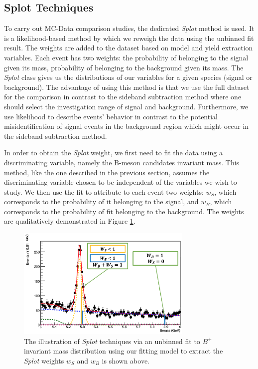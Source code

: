 \subsection{\textbf{Splot} Techniques}

To carry out MC-Data comparison studies, the dedicated \textit{Splot} method is used. It is a likelihood-based method by which we reweigh the data using the unbinned fit result. The weights are added to the dataset based on model and yield extraction variables. Each event has two weights: the probability of belonging to the signal given its mass, probability of belonging to the background given its mass. The \textit{Splot} class gives us the distributions of our variables for a given species (signal or background). The advantage of using this method is that we use the full dataset for the comparison in contrast to the sideband subtraction method where one should select the investigation range of signal and background. Furthermore, we use likelihood to describe events' behavior in contrast to the potential misidentification of signal events in the background region which might occur in the sideband subtraction method. 


In order to obtain the \textit{Splot} weight, we first need to fit the data using a discriminating variable, namely the B-meson candidates invariant mass. This method, like the one described in the previous section, assumes the discriminating variable chosen to be independent of the variables we wish to study. We then use the fit to attribute to each event two weights: $w_{S}$, which corresponds to the probability of it belonging to the signal, and $w_B$, which corresponds to the probability of fit belonging to the background. The weights are qualitatively demonstrated in Figure \ref{SplotPic}.


\begin{figure}[h]
\begin{center}
\includegraphics[width=0.75\textwidth]{Figures/Chapter5/SplotWeighPic.png}
\caption{The illustration of \textit{Splot} techniques via an unbinned fit to $B^+$ invariant mass distribution using our fitting model to extract the \textit{Splot} weights $w_S$ and $w_B$ is shown above.}
\label{SplotPic}
\end{center}
\end{figure}


